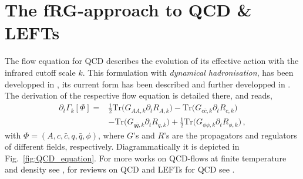 \documentclass[%
reprint,
superscriptaddress,
showpacs,preprintnumbers,
amsmath,amssymb,
aps,
prd,
]{revtex4-1}
\def\Fig#1{Fig.~\ref{#1}} \def\Tab#1{Tab.~\ref{#1}}
\begin{document}
	
	\appendix
	
	\section{The fRG-approach to QCD \& LEFTs}\label{app:fRG}
	
	The flow equation for QCD describes the evolution of its effective action with the infrared cutoff scale $k$. This formulation with \textit{dynamical hadronisation}, \cite{Gies:2001nw, Gies:2002hq, Pawlowski:2005xe, Floerchinger:2009uf, Fu:2019hdw} has been developped in \cite{Mitter:2014wpa,Braun:2014ata,Cyrol:2017ewj,Fu:2019hdw}, its current form has been described and further developped in \cite{Fu:2019hdw}. The derivation of the respective flow equation is detailed there, and reads, 
	\begin{align}
		\partial_t\Gamma_k[\Phi]=&\frac{1}{2}\mathrm{Tr}\Big(G_{AA,k}\partial_t R_{A,k}\Big)-\mathrm{Tr}\Big(G_{c\bar c,k}\partial_t R_{c,k}\Big)\nonumber\\[2ex]
		&-\mathrm{Tr}\Big(G_{q\bar q,k}\partial_t R_{q,k}\Big)+\frac{1}{2}\mathrm{Tr}\Big(G_{\phi\phi,k}\partial_t R_{\phi,k}\Big)\,,\label{eq:QCDflow}
	\end{align}
	with $\Phi=(A, c, \bar c, q,\bar q,\phi)$, where $G$'s and $R$'s are the propagators and regulators of different fields, respectively. Diagrammatically it is depicted in \Fig{fig:QCD_equation}. For more works on QCD-flows at finite temperature and density see \cite{Braun:2007bx,Braun:2008pi,Braun:2009gm,Mitter:2014wpa,Braun:2014ata,Cyrol:2016tym,Cyrol:2017ewj,Cyrol:2017qkl,Fu:2019hdw,Braun:2020ada}, for reviews on QCD and LEFTs for QCD see    \cite{Berges:2000ew,Pawlowski:2005xe,Schaefer:2006sr,Gies:2006wv,Rosten:2010vm,Braun:2011pp,Pawlowski:2014aha,Dupuis:2020fhh}.
	
\end{document}
